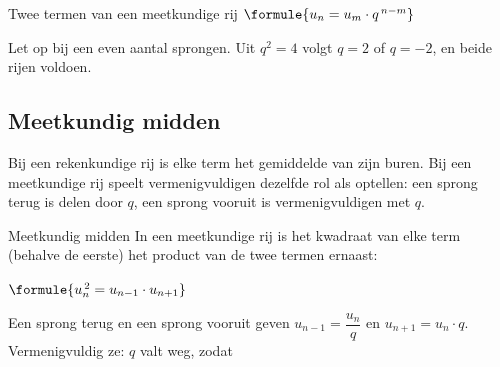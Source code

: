 \begin{theorie}
\begin{stelling}{Twee termen van een meetkundige rij}
\qquad $\formule{u_n = u_m \cdot q^{\,n-m}}$
\end{stelling}
\end{theorie}

Let op bij een even aantal sprongen. Uit $q^2 = 4$ volgt $q = 2$ of $q = -2$, en beide rijen voldoen.



\begin{oefeningen}
\end{oefeningen}

\subsection{Meetkundig midden}

Bij een rekenkundige rij is elke term het gemiddelde van zijn buren. Bij een meetkundige rij speelt vermenigvuldigen dezelfde rol als optellen: een sprong terug is delen door $q$, een sprong vooruit is vermenigvuldigen met $q$.

\begin{theorie}
\begin{stelling}{Meetkundig midden}
In een meetkundige rij is het kwadraat van elke term (behalve de eerste) het product van de twee termen ernaast:

\vspace{1mm}
\qquad $\formule{u_n^{\,2} = u_{n-1} \cdot u_{n+1}}$
\end{stelling}

\begin{bewijs}
Een sprong terug en een sprong vooruit geven $u_{n-1} = \dfrac{u_n}{q}$ en $u_{n+1} = u_n \cdot q$. Vermenigvuldig ze: $q$ valt weg, zodat
\end{bewijs}
\end{theorie}

